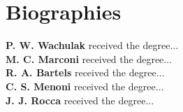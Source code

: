 \documentclass[]{IEEEphot}
\begin{document}




\section*{Biographies}

\textbf{P. W. Wachulak} received the degree${\ldots}$ \\[6pt]
\textbf{M. C. Marconi} received the degree${\ldots}$ \\[6pt]
\textbf{R. A. Bartels} received the degree${\ldots}$ \\[6pt]
\textbf{C. S. Menoni} received the degree${\ldots}$ \\[6pt]
\textbf{J. J. Rocca} received the degree${\ldots}$
\end{document}
